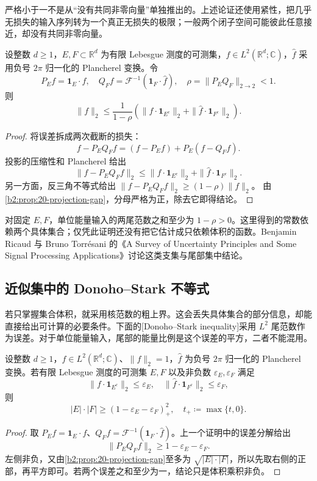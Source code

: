 严格小于一不是从“没有共同非零向量”单独推出的。上述论证还使用紧性，把几乎无损失的输入序列转为一个真正无损失的极限；一般两个闭子空间可能彼此任意接近，却没有共同非零向量。

\begin{corollary}[有限测度集的尾部估计]
\label{b2:thm:20-annihilating-pair}
设整数 \(d\geq1\)，\(E,F\subset\mathbb R^d\) 为有限 Lebesgue 测度的可测集，\(f\in L^2(\mathbb R^d;\mathbb C)\)，\(\widehat f\) 采用负号 \(2\pi\) 归一化的 Plancherel 变换。令
\[
 P_Ef=\mathbf1_E\cdot f,
 \quad Q_Ff=\mathcal F^{-1}(\mathbf1_F\cdot\widehat f),
 \quad \rho=\|P_EQ_F\|_{2\to2}<1.
\]
则
\[
 \|f\|_2\leq\frac1{1-\rho}
 \left(\|f\cdot\mathbf1_{E^c}\|_2+
       \|\widehat f\cdot\mathbf1_{F^c}\|_2\right).
\]
\end{corollary}
\begin{proof}
将误差拆成两次截断的损失：
\[
 f-P_EQ_Ff=(f-P_Ef)+P_E(f-Q_Ff).
\]
投影的压缩性和 Plancherel 给出
\[
 \|f-P_EQ_Ff\|_2
 \leq\|f\cdot\mathbf1_{E^c}\|_2+
       \|\widehat f\cdot\mathbf1_{F^c}\|_2.
\]
另一方面，反三角不等式给出
\(\|f-P_EQ_Ff\|_2\geq(1-\rho)\|f\|_2\)。
由\cref{b2:prop:20-projection-gap}，分母严格为正，除去它即得结论。
\end{proof}

对固定 \(E,F\)，单位能量输入的两尾范数之和至少为 \(1-\rho>0\)。这里得到的常数依赖两个具体集合；仅凭此证明还没有把它估计成只依赖体积的函数。Benjamin Ricaud 与 Bruno Torrésani 的《A Survey of Uncertainty Principles and Some Signal Processing Applications》\cite[Section 3.3.2]{Ricaud2013Survey}讨论这类支集与尾部集中结论。

\subsection{近似集中的 Donoho–Stark 不等式}
\label{b2:subsec:200304}

若只掌握集合体积，就采用核范数的粗上界。这会丢失具体集合的部分信息，却能直接给出可计算的必要条件。下面的[Donoho--Stark inequality]采用 \(L^2\) 尾范数作为误差。对于单位能量输入，尾部的能量比例是这个误差的平方，二者不能混用。

\begin{theorem}\label{b2:thm:20-donoho-stark}
设整数 \(d\geq1\)，\(f\in L^2(\mathbb R^d;\mathbb C)\)、\(\|f\|_2=1\)，\(\widehat f\) 为负号 \(2\pi\) 归一化的 Plancherel 变换。若有限 Lebesgue 测度的可测集 \(E,F\) 以及非负数 \(\varepsilon_E,\varepsilon_F\) 满足
\[
 \|f\cdot\mathbf1_{E^c}\|_2\leq\varepsilon_E,
 \quad
 \|\widehat f\cdot\mathbf1_{F^c}\|_2\leq\varepsilon_F,
\]
则
\[
 |E|\cdot|F|\geq(1-\varepsilon_E-\varepsilon_F)_+^2,
 \quad t_+\coloneqq\max\{t,0\}.
\]
\end{theorem}
\begin{proof}
取 \(P_Ef=\mathbf1_E\cdot f\)、\(Q_Ff=\mathcal F^{-1}(\mathbf1_F\cdot\widehat f)\)。上一个证明中的误差分解给出
\[
 \|P_EQ_Ff\|_2\geq1-\varepsilon_E-\varepsilon_F.
\]
左侧非负，又由\cref{b2:prop:20-projection-gap}至多为 \(\sqrt{|E|\cdot|F|}\)，所以先取右侧的正部，再平方即可。若两个误差之和至少为一，结论只是体积乘积非负。
\end{proof}

